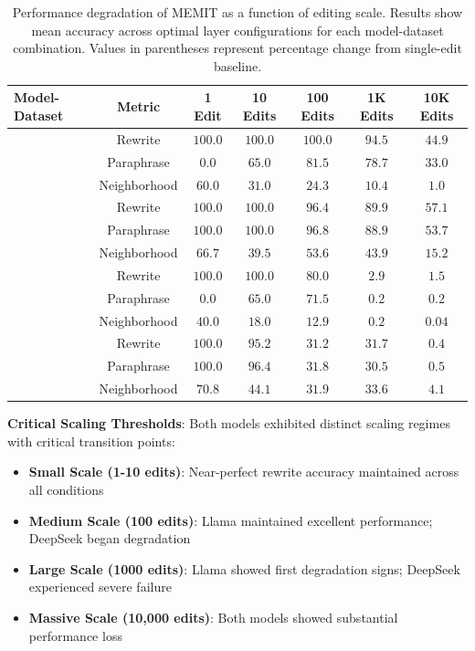\begin{table}[H]
\centering
\caption[MEMIT Performance Scaling Behavior]{Performance degradation of MEMIT as a function of editing scale. Results show mean accuracy across optimal layer configurations for each model-dataset combination. Values in parentheses represent percentage change from single-edit baseline.}
\label{tab:scaling_behavior}
\begin{tabular}{lcccccc}
\toprule
\textbf{Model-Dataset} & \textbf{Metric} & \textbf{1 Edit} & \textbf{10 Edits} & \textbf{100 Edits} & \textbf{1K Edits} & \textbf{10K Edits} \\
\midrule
{} & Rewrite & $100.0$ & $100.0$ & $100.0$ & $94.5$ & $44.9$ \\
 & Paraphrase & $0.0$ & $65.0$ & $81.5$ & $78.7$ & $33.0$ \\
 & Neighborhood & $60.0$ & $31.0$ & $24.3$ & $10.4$ & $1.0$ \\
\midrule
{} & Rewrite & $100.0$ & $100.0$ & $96.4$ & $89.9$ & $57.1$ \\
 & Paraphrase & $100.0$ & $100.0$ & $96.8$ & $88.9$ & $53.7$ \\
 & Neighborhood & $66.7$ & $39.5$ & $53.6$ & $43.9$ & $15.2$ \\
\midrule
{} & Rewrite & $100.0$ & $100.0$ & $80.0$ & $2.9$ & $1.5$ \\
 & Paraphrase & $0.0$ & $65.0$ & $71.5$ & $0.2$ & $0.2$ \\
 & Neighborhood & $40.0$ & $18.0$ & $12.9$ & $0.2$ & $0.04$ \\
\midrule
{} & Rewrite & $100.0$ & $95.2$ & $31.2$ & $31.7$ & $0.4$ \\
 & Paraphrase & $100.0$ & $96.4$ & $31.8$ & $30.5$ & $0.5$ \\
 & Neighborhood & $70.8$ & $44.1$ & $31.9$ & $33.6$ & $4.1$ \\
\bottomrule
\end{tabular}
\end{table}

\textbf{Critical Scaling Thresholds}: Both models exhibited distinct scaling regimes with critical transition points:

\begin{itemize}
    \item \textbf{Small Scale (1-10 edits)}: Near-perfect rewrite accuracy maintained across all conditions
    \item \textbf{Medium Scale (100 edits)}: Llama maintained excellent performance; DeepSeek began degradation
    \item \textbf{Large Scale (1000 edits)}: Llama showed first degradation signs; DeepSeek experienced severe failure
    \item \textbf{Massive Scale (10,000 edits)}: Both models showed substantial performance loss
\end{itemize}

